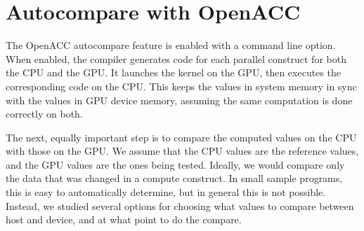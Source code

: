 \section{Autocompare with OpenACC}

The OpenACC autocompare feature is enabled with a command line option.
When enabled, the compiler generates code for each parallel construct for both the CPU and the GPU.
It launches the kernel on the GPU, then executes the corresponding code on the CPU.
This keeps the values in system memory in sync with the values in GPU device memory, assuming the same computation is done correctly on both.

The next, equally important step is to compare the computed values on the CPU with those on the GPU.
We assume that the CPU values are the reference values, and the GPU values are the ones being tested.
Ideally, we would compare only the data that was changed in a compute construct.
In small sample programs, this is easy to automatically determine, but in general this is not possible.
Instead, we studied several options for choosing what values to compare between host and device, and at what point to do the compare.

